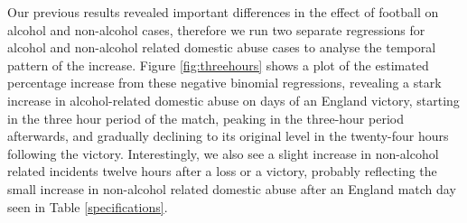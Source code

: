 \documentclass[12pt, a4paper]{article}
\begin{document}
Our previous results revealed important differences in the effect of football on alcohol and non-alcohol cases, therefore we run two separate regressions for alcohol and non-alcohol related domestic abuse cases to analyse the temporal pattern of the increase. Figure \ref{fig:threehours} shows a plot of the estimated percentage increase from these negative binomial regressions, revealing a stark increase in alcohol-related domestic abuse on days of an England victory, starting in the three hour period of the match, peaking in the three-hour period afterwards, and gradually declining to its original level in the twenty-four hours following the victory. Interestingly, we also see a slight increase in non-alcohol related incidents twelve hours after a loss or a victory, probably reflecting the small increase in non-alcohol related domestic abuse after an England match day seen in Table \ref{specifications}.



\end{document}
